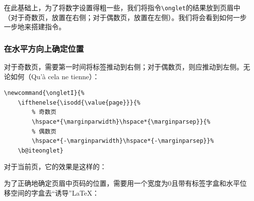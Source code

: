 在此基础上，为了将数字设置得粗一些，我们将指令\verb|\onglet|的结果放到页眉中（对于奇数页，放置在右侧；对于偶数页，放置在左侧）。我们将会看到如何一步一步地来搭建指令。

\subsubsection{在水平方向上确定位置}

对于奇数页，需要第一时间将标签推动到右侧；对于偶数页，则应推动到左侧。无论如何（Qu'à cela ne tienne）：

\begin{dmd}
\begin{verbatim}
\newcommand{\ongletI}{% 
    \ifthenelse{\isodd{\value{page}}}{%
        % 奇数页 
        \hspace*{\marginparwidth}\hspace*{\marginparsep}}{% 
        % 偶数页 
        \hspace*{-\marginparwidth}\hspace*{-\marginparsep}}%
    \b@iteonglet}\end{verbatim}
\end{dmd}

对于当前页，它的效果是这样的：

\newcommand{\ongletI}{%
    \ifthenelse{\isodd{\value{page}}}{%
      \hspace*{\marginparwidth}\hspace*{\marginparsep}}{%
      \hspace*{-\marginparwidth}\hspace*{-\marginparsep}}%
    \biteonglet}

\ifthenelse{\isodd{\value{page}}}{%
  \begin{flushright}
    \bfseries\thepage\ongletI\\
    \rule{\textwidth}{.4pt}
  \end{flushright}}{%
  \begin{flushleft}
  \ongletI\bfseries\thepage\\
    \rule{\textwidth}{.4pt}
  \end{flushleft}}


为了正确地确定页眉中页码的位置，需要用一个宽度为0且带有标签字盒和水平位移空间的字盒去“诱导”\LaTeX ：

\begin{dmd}
\begin{verbatim}
\newcommand{\ongletII}{% \makebox[0pt][l]{%
    % 对于奇数页
    \ifthenelse{\isodd{\value{page}}}{%
        \hspace*{\marginparwidth}\hspace*{\marginparsep}}{% 
    % 否则
        \hspace*{-\marginparwidth}\hspace*{-\marginparsep}}% \b@iteonglet}}\end{verbatim}
\end{dmd}

